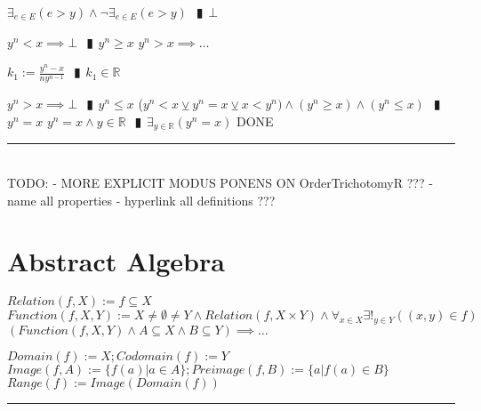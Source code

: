 \documentclass{book}
\newcommand{\abr}{:=}
\newcommand{\pipe}{$\phantom{(}\vrectangleblack\phantom{)}$}
\begin{document}
\begin{enumerate}
\begin{enumerate}
    \lit $\exists_{e \in E}(e > y) \land \lnot \exists_{e \in E}(e > y)$ \pipe $\bot$
  \end{enumerate}
  \lit $y^n < x \implies \bot$ \pipe $y^n \geq x$
  \lit $y^n > x \implies \ldots$
  \begin{enumerate}
    \lit $k_1 \abr \frac{y^n - x}{n y^{n - 1}}$ \pipe $k_1 \in \mathbb{R}$
  \end{enumerate}
  \lit $y^n > x \implies \bot$ \pipe $y^n \leq x$
  \lit ($y^n < x \veebar y^n = x \veebar x < y^n) \land( y^n \geq x) \land (y^n \leq x)$ \pipe $y^n = x$
  \lit $y^n = x \land y \in \mathbb{R}$ \pipe $\exists_{y \in \mathbb{R}}(y^n = x)$
  DONE
\end{enumerate} \vspace{.75mm} \hrule \vspace{.75mm} \ \\ 





TODO:
- MORE EXPLICIT MODUS PONENS ON OrderTrichotomyR ???
- name all properties
- hyperlink all definitions ???

\chapter{Abstract Algebra}
$Relation(f, X) \abr f \subseteq X$ \\
$Function(f, X, Y) \abr X \neq \emptyset \neq Y \land Relation(f, X \times Y) \land \forall_{x \in X} \exists!_{y \in Y}((x, y) \in f)$ \\

$(Function(f, X, Y) \land A \subseteq X \land B \subseteq Y) \implies \ldots$
\begin{enumerate}
  \lit $Domain(f) \abr X; Codomain(f) \abr Y$ %
  \lit $Image(f, A) \abr \{f(a) | a \in A\}; Preimage(f, B) \abr \{a | f(a) \in B\}$
  \lit $Range(f) \abr Image(Domain(f))$
\end{enumerate} \vspace{.75mm} \hrule \vspace{.75mm} \ \\ 
\end{document}
